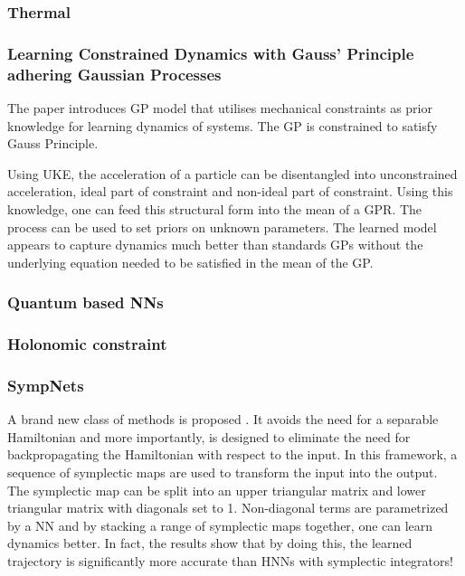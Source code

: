 \documentclass{article}
\begin{document}
\subsubsection{Thermal}


\subsubsection{Learning Constrained Dynamics with Gauss' Principle adhering Gaussian Processes}

The paper \cite{geist_learning_2020} introduces GP model that utilises mechanical constraints as prior knowledge for learning dynamics of systems. The GP is constrained to satisfy Gauss Principle. 

Using UKE, the acceleration of a particle can be disentangled into unconstrained acceleration, ideal part of constraint and non-ideal part of constraint.  Using this knowledge, one can feed this structural form into the mean of a GPR. The process can be used to set priors on unknown parameters. The learned model appears to capture dynamics much better than standards GPs without the underlying equation needed to be satisfied in the mean of the GP.





\subsubsection{Quantum based NNs}


\subsubsection{Holonomic constraint}



\subsubsection{SympNets}

A brand new class of methods is proposed . It avoids the need for a separable Hamiltonian and more importantly, is designed to eliminate the need for backpropagating the Hamiltonian with respect to the input. In this framework, a sequence of symplectic maps are used to transform the input into the output. The symplectic map can be split into an upper triangular matrix and lower triangular matrix with diagonals set to 1. Non-diagonal terms are parametrized by a NN and by stacking a range of symplectic maps together, one can learn dynamics better. In fact, the results show that by doing this, the learned trajectory is significantly more accurate than HNNs with symplectic integrators!
\end{document}
